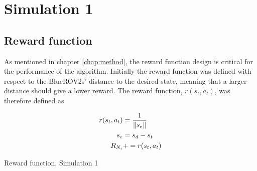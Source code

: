 \section{Simulation 1}
\subsection*{Reward function}
As mentioned in chapter \ref{chap:method}, the reward function design is critical for the performance of the algorithm. Initially the reward function was defined with respect to the BlueROV2s' distance to the desired state, meaning that a larger distance should give a lower reward. The reward function, $r(s_{t}, a_{t})$, was therefore defined as

\begin{algorithm}[H]
\SetAlgoLined
\begin{align}
    r(s_{t}, a_{t}) & = \frac{1}{\left\lVert s_{e}\right\rVert} \\
    s_{e} & = s_{d} - s_{t} \\
    R_{N_{i}} & += r(s_{t}, a_{t})
\end{align}
\caption{Reward function, Simulation 1}
\label{alg:reward_func_1}
\end{algorithm}
